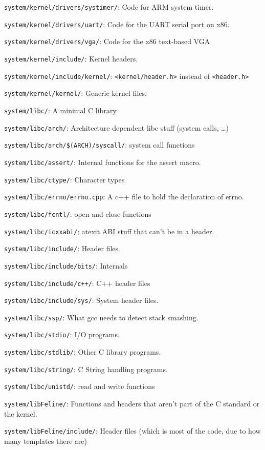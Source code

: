 \documentclass[12pt]{article}
\newcommand{\code}[1]{\colorbox{light-gray}{\texttt{#1}}}
\begin{document}
\begin{list}{}{}
\item \code{system/kernel/drivers/systimer/}: Code for ARM system timer.
\item \code{system/kernel/drivers/uart/}: Code for the UART serial port on x86.
\item \code{system/kernel/drivers/vga/}: Code for the x86 text-based VGA
\item \code{system/kernel/include/}: Kernel headers.
\item \code{system/kernel/include/kernel/}: \code{<kernel/header.h>} instead of \code{<header.h>}
\item \code{system/kernel/kernel/}: Generic kernel files.
\item \code{system/libc/}: A minimal C library
\item \code{system/libc/arch/}: Architecture dependent libc stuff (system calls, …)
\item \code{system/libc/arch/\$(ARCH)/syscall/}: system call functions
\item \code{system/libc/assert/}: Internal functions for the assert macro.
\item \code{system/libc/ctype/}: Character types
\item \code{system/libc/errno/errno.cpp}: A c++ file to hold the declaration of errno.
\item \code{system/libc/fcntl/}: open and close functions
\item \code{system/libc/icxxabi/}: atexit ABI stuff that can't be in a header.
\item \code{system/libc/include/}: Header files.
\item \code{system/libc/include/bits/}: Internals
\item \code{system/libc/include/c++/}: C++ header files
\item \code{system/libc/include/sys/}: System header files.
\item \code{system/libc/ssp/}: What gcc needs to detect stack smashing.
\item \code{system/libc/stdio/}: I/O programs.
\item \code{system/libc/stdlib/}: Other C library programs.
\item \code{system/libc/string/}: C String handling programs.
\item \code{system/libc/unistd/}: read and write functions
\item \code{system/libFeline/}: Functions and headers that aren't part of the C standard or the kernel.
\item \code{system/libFeline/include/}: Header files (which is most of the code, due to how many templates there are)

\end{list}
\end{document}
